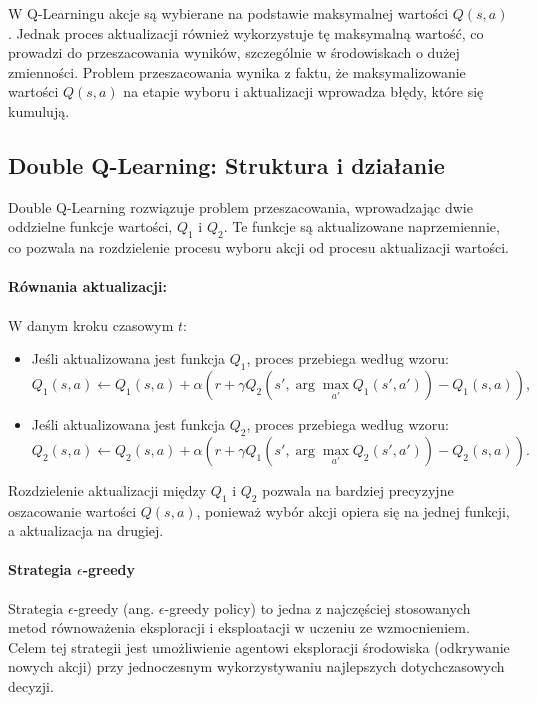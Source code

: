 W Q-Learningu akcje są wybierane na podstawie maksymalnej wartości \(Q(s, a)\). Jednak proces aktualizacji również wykorzystuje tę maksymalną wartość, co prowadzi do przeszacowania wyników, szczególnie w środowiskach o dużej zmienności. Problem przeszacowania wynika z faktu, że maksymalizowanie wartości \(Q(s, a)\) na etapie wyboru i aktualizacji wprowadza błędy, które się kumulują.

\subsection{Double Q-Learning: Struktura i działanie}

Double Q-Learning rozwiązuje problem przeszacowania, wprowadzając dwie oddzielne funkcje wartości, \(Q_1\) i \(Q_2\). Te funkcje są aktualizowane naprzemiennie, co pozwala na rozdzielenie procesu wyboru akcji od procesu aktualizacji wartości.

\paragraph{Równania aktualizacji:}
W danym kroku czasowym \(t\):
\begin{itemize}
	\item Jeśli aktualizowana jest funkcja \(Q_1\), proces przebiega według wzoru:
	      \[
		      Q_1(s, a) \leftarrow Q_1(s, a) + \alpha \left( r + \gamma Q_2(s', \arg\max_{a'} Q_1(s', a')) - Q_1(s, a) \right),
	      \]
	\item Jeśli aktualizowana jest funkcja \(Q_2\), proces przebiega według wzoru:
	      \[
		      Q_2(s, a) \leftarrow Q_2(s, a) + \alpha \left( r + \gamma Q_1(s', \arg\max_{a'} Q_2(s', a')) - Q_2(s, a) \right).
	      \]
\end{itemize}

Rozdzielenie aktualizacji między \(Q_1\) i \(Q_2\) pozwala na bardziej precyzyjne oszacowanie wartości \(Q(s, a)\), ponieważ wybór akcji opiera się na jednej funkcji, a aktualizacja na drugiej.

\paragraph{Strategia \(\epsilon\)-greedy}

Strategia \(\epsilon\)-greedy (ang. \(\epsilon\)-greedy policy) to jedna z najczęściej stosowanych metod równoważenia eksploracji i eksploatacji w uczeniu ze wzmocnieniem. Celem tej strategii jest umożliwienie agentowi eksploracji środowiska (odkrywanie nowych akcji) przy jednoczesnym wykorzystywaniu najlepszych dotychczasowych decyzji.

